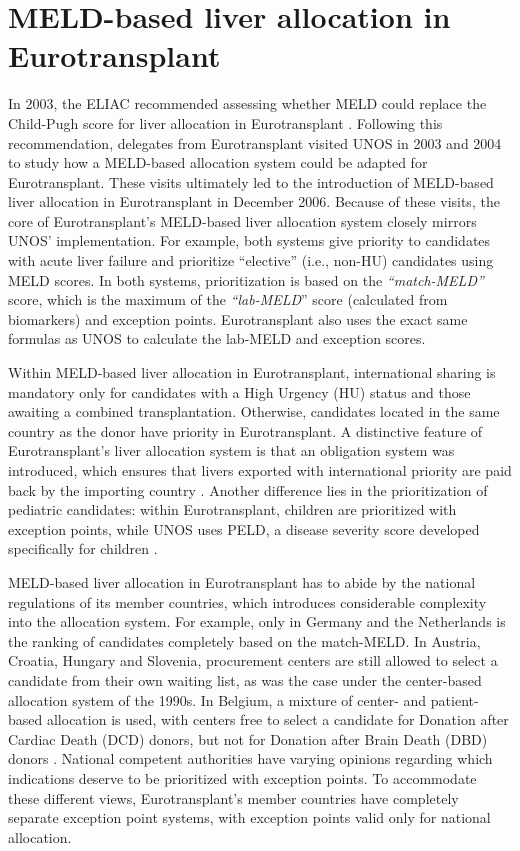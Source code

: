 \documentclass[11pt,twoside,]{book}
\begin{document}
\section{MELD-based liver allocation in Eurotransplant}\label{meld-based-liver-allocation-in-eurotransplant}

In 2003, the ELIAC recommended assessing whether MELD could replace the Child-Pugh
score for liver allocation in Eurotransplant \citep{Jung2008}. Following this
recommendation, delegates from Eurotransplant visited UNOS in 2003 and 2004 to
study how a MELD-based allocation system could be adapted for Eurotransplant.
These visits ultimately led to the introduction of MELD-based liver allocation in
Eurotransplant in December 2006.
\newpage
Because of these visits, the core of Eurotransplant's MELD-based liver allocation
system closely mirrors UNOS' implementation. For example, both systems give
priority to candidates with acute liver failure and prioritize ``elective''
(i.e., non-HU) candidates using MELD scores. In both systems, prioritization is
based on the \emph{``match-MELD''} score, which is the maximum of the \emph{``lab-MELD}'' score
(calculated from biomarkers) and exception points. Eurotransplant also
uses the exact same formulas as UNOS to calculate the lab-MELD and exception scores.

Within MELD-based liver allocation in Eurotransplant, international sharing is mandatory
only for candidates with a High Urgency (HU) status and those awaiting a combined
transplantation. Otherwise, candidates located in the same country as the donor
have priority in Eurotransplant. A distinctive feature of Eurotransplant's
liver allocation system is
that an obligation system was introduced, which ensures that livers exported
with international priority are paid back by the importing country \citep{jochmansAdultLiverAllocation2017}.
Another difference lies in the prioritization of pediatric candidates: within
Eurotransplant, children are prioritized with exception points, while UNOS
uses PELD, a disease severity score developed specifically for children
\citep{freemanImprovingLiverAllocation2004}.

MELD-based liver allocation in Eurotransplant has to abide by the national regulations
of its member countries, which introduces considerable complexity into the
allocation system. For example, only in Germany and the Netherlands is the ranking
of candidates completely based on the match-MELD. In Austria, Croatia, Hungary
and Slovenia, procurement centers are still allowed to select a candidate from
their own waiting list, as was the case under the center-based allocation system
of the 1990s. In Belgium, a mixture of center- and patient-based allocation
is used, with centers free to select a candidate for Donation after Cardiac Death
(DCD) donors, but not for Donation after Brain Death (DBD) donors \citep{jochmansAdultLiverAllocation2017}.
National competent authorities have varying opinions regarding which indications deserve
to be prioritized with exception points. To accommodate these different views,
Eurotransplant's member countries have completely separate exception point systems, with exception
points valid only for national allocation.
\end{document}
